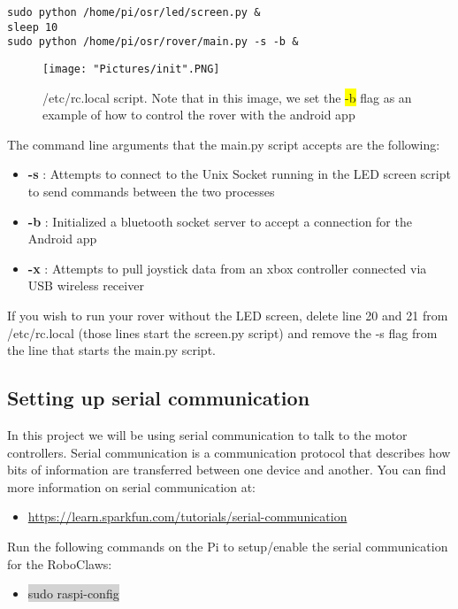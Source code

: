 \documentclass[12pt]{article}
\begin{document}
\begin{verbatim}
sudo python /home/pi/osr/led/screen.py &
sleep 10
sudo python /home/pi/osr/rover/main.py -s -b &
\end{verbatim}

\begin{figure}[H]
 	\centering
	\texttt{[image: "Pictures/init".PNG]}
 	\caption{/etc/rc.local script.  Note that in this image, we set the \colorbox{yellow}{-b} flag as an example of how to control the rover with the android app}
	\label{init}
\end{figure}

The command line arguments that the main.py script accepts are the following:

\begin{itemize}
	\item[] \textbf{-s} : Attempts to connect to the Unix Socket running in the LED screen script to send commands between the two processes
	\item[] \textbf{-b} : Initialized a bluetooth socket server to accept a connection for the Android app
	\item[] \textbf{-x} : Attempts to pull joystick data from an xbox controller connected via USB wireless receiver
\end{itemize}

If you wish to run your rover without the LED screen, delete line 20 and 21 from /etc/rc.local (those lines start the screen.py script) and remove the -s flag from the line that starts the main.py script.

\subsection{Setting up serial communication}	

In this project we will be using serial communication to talk to the motor controllers. Serial communication is a communication protocol that describes how bits of information are transferred between one device and another. You can find more information on serial communication at:
\begin{itemize}
	\item \href{https://learn.sparkfun.com/tutorials/serial-communication}{https://learn.sparkfun.com/tutorials/serial-communication}
\end{itemize}

\noindent Run the following commands on the Pi to setup/enable the serial communication for the RoboClaws:
\begin{itemize}
	\item[] \colorbox{lightgray}{sudo raspi-config}
\end{itemize}
\end{document}
